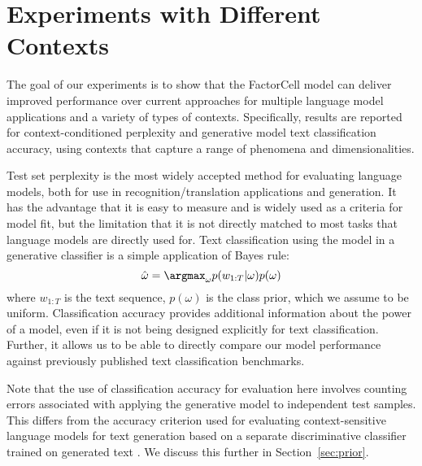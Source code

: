 \section{Experiments with Different Contexts}
\label{sec:experiments}

The goal of our experiments is to show that the FactorCell model can deliver improved performance over current approaches for multiple language model applications and a variety of types of contexts. Specifically, results are reported for context-conditioned perplexity and generative model text classification accuracy, using contexts that capture a range of phenomena and dimensionalities.

Test set perplexity 
is the most widely accepted method for evaluating language models, both for use in recognition/translation applications and generation. It has the advantage that it is easy to measure and is widely used as a criteria for model fit, but the limitation that it is not directly matched to most tasks that language models are directly used for. 
Text classification using the model in a generative classifier is a simple application of Bayes rule:
\begin{equation}
\label{eq:bayes}
    \hat \omega = \argmax_\omega p(w_{1:T} | \omega) p(\omega)
\end{equation}
where $w_{1:T}$ is the text sequence, $p(\omega)$ is the class prior, which we assume to be uniform.
Classification accuracy provides additional information about the power of a model, even if it is not being designed explicitly for text classification. Further, it allows us to be able to directly compare our model performance against previously published text classification benchmarks. 


Note that the use of classification accuracy for evaluation here involves counting errors associated with applying the generative model to independent test samples. This differs from the accuracy criterion used for evaluating context-sensitive language models for text generation based on a separate discriminative classifier trained on generated text \cite{Ficler2017ControllingLS,Hu2017ControllableTG}. We discuss this further in Section~\ref{sec:prior}.


